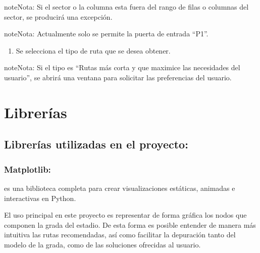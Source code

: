 \documentclass[letterpaper,10pt,spanish]{sphinxmanual}
\begin{document}
\begin{sphinxadmonition}{note}{Nota:}
\sphinxAtStartPar
Si el sector o la columna esta fuera del rango de filas o columnas del sector, se producirá una excepción.
\end{sphinxadmonition}

\begin{sphinxadmonition}{note}{Nota:}
\sphinxAtStartPar
Actualmente solo se permite la puerta de entrada “P1”.
\end{sphinxadmonition}
\begin{enumerate}
%
\setcounter{enumi}{2}
\item {} 
\sphinxAtStartPar
Se selecciona el tipo de ruta que se desea obtener.

\end{enumerate}

\begin{sphinxadmonition}{note}{Nota:}
\sphinxAtStartPar
Si el tipo es  “Rutas más corta y que maximice las necesidades del usuario”, se abrirá una ventana para solicitar las preferencias del usuario.
\end{sphinxadmonition}


\chapter{Librerías}
\label{\detokenize{Librerias:librerias}}\label{\detokenize{Librerias::doc}}

\section{Librerías utilizadas en el proyecto:}
\label{\detokenize{Librerias:librerias-utilizadas-en-el-proyecto}}

\subsection{Matplotlib:}
\label{\detokenize{Librerias:matplotlib}}
\sphinxAtStartPar
{} es una biblioteca completa para crear visualizaciones estáticas, animadas e interactivas en Python.

\sphinxAtStartPar
El uso principal en este proyecto es representar de forma gráfica los nodos que componen la grada del estadio. De esta forma es posible entender de manera más intuitiva las rutas recomendadas,
así como facilitar la depuración tanto del modelo de la grada, como de las soluciones ofrecidas al usuario.
\end{document}
